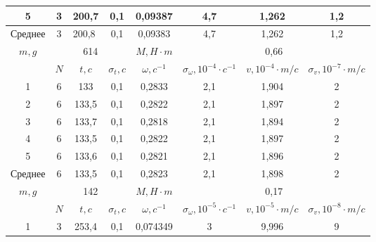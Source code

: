 \documentclass[a4paper, 12pt]{article}%
\begin{document}
\begin{enumerate}
\begin{center}
\begin{tabular}{|c|c|c|c|c|c|c|c|}
5                            & 3   & 200,7                       & 0,1           & 0,09387       & 4,7                                     & 1,262                  & 1,2                           \\ \hline
Среднее                      & 3   & \multicolumn{1}{l|}{200,8} & 0,1           & 0,09383      & 4,7                                     & 1,262                  & 1,2                           \\ \hline
\hline
$m, g$  & \multicolumn{3}{c|}{614}     & $M, H \cdot m$   & \multicolumn{3}{c|}{0,66}                                                                        \\ \hline
        & $N$ & $t, c$ & $\sigma_t, c$ & $\omega, c^{-1}$ & $\sigma_{\omega}, 10^{-4} \cdot c^{-1}$ & $v, 10^{-4} \cdot m/c$ & $\sigma_v, 10^{-7} \cdot m/c$ \\ \hline
1       & 6   & 133    & 0,1           & 0,2833           & 2,1                                     & 1,904                  & 2                             \\ \hline
2       & 6   & 133,5  & 0,1           & 0,2822           & 2,1                                     & 1,897                  & 2                             \\ \hline
3       & 6   & 133,7  & 0,1           & 0,2818           & 2,1                                     & 1,894                  & 2                             \\ \hline
4       & 6   & 133,5  & 0,1           & 0,2822           & 2,1                                     & 1,897                  & 2                             \\ \hline
5       & 6   & 133,6  & 0,1           & 0,2821           & 2,1                                     & 1,896                  & 2                             \\ \hline
Среднее & 6   & 133,5 & 0,1           & 0,2823           & 2,1                                     & 1,898                  & 2                             \\ \hline
\hline
$m, g$  & \multicolumn{3}{c|}{142}     & $M, H \cdot m$   & \multicolumn{3}{c|}{0,17}                                                                        \\ \hline
        & $N$ & $t, c$ & $\sigma_t, c$ & $\omega, c^{-1}$ & $\sigma_{\omega}, 10^{-5} \cdot c^{-1}$ & $v, 10^{-5} \cdot m/c$ & $\sigma_v, 10^{-8} \cdot m/c$ \\ \hline
1       & 3   & 253,4  & 0,1           & 0,074349         & 3                                       & 9,996                  & 9                             \\ \hline

\end{tabular}
\end{center}
\end{enumerate}
\end{document}
